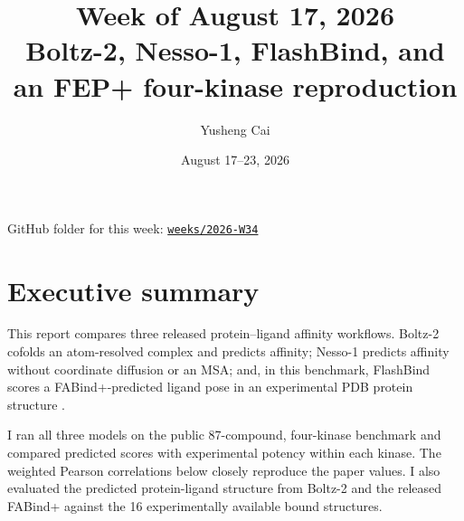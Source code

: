 \documentclass[11pt]{article}
\title{\textbf{Week of August 17, 2026}\\
Boltz-2, Nesso-1, FlashBind, and an FEP+ four-kinase reproduction}
\author{Yusheng Cai}
\date{August 17--23, 2026}
\begin{document}
\maketitle
\begin{center}
  \small GitHub folder for this week:
  \href{https://github.com/Yusheng-cai/BindingAffinityPredictor/tree/main/weeks/2026-W34}%
       {\texttt{weeks/2026-W34}}
\end{center}

\section*{Executive summary}

This report compares three released protein--ligand affinity workflows.
Boltz-2 cofolds an atom-resolved complex and predicts affinity; Nesso-1
predicts affinity without coordinate diffusion or an MSA; and, in this
benchmark, FlashBind scores a FABind+-predicted ligand pose in an experimental
PDB protein structure
\citep{passaro2025boltz2,shenoy2026nesso1,jiang2026flashbind}.

I ran all three models on the public 87-compound, four-kinase benchmark and
compared predicted scores with experimental potency within each kinase. The
weighted Pearson correlations below closely reproduce the paper values. I
also evaluated the predicted protein-ligand structure from Boltz-2 and the released FABind+ against the 16 experimentally available bound structures.
\end{document}
